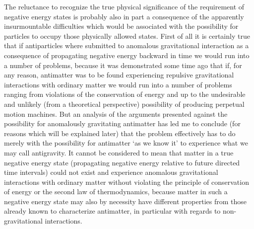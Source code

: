 \documentclass[notitlepage,12pt]{report}
\begin{document}
The reluctance to recognize the true physical significance of the requirement of negative energy states is probably also in part a consequence of the apparently insurmountable difficulties which would be associated with the possibility for particles to occupy those physically allowed states. First of all it is certainly true that if antiparticles where submitted to anomalous gravitational interaction as a consequence of propagating negative energy backward in time we would run into a number of problems, because it was demonstrated some time ago \cite{Nieto-1} that if, for any reason, antimatter was to be found experiencing repulsive gravitational interactions with ordinary matter we would run into a number of problems ranging from violations of the conservation of energy and up to the undesirable and unlikely (from a theoretical perspective) possibility of producing perpetual motion machines. But an analysis of the arguments presented against the possibility for anomalously gravitating antimatter has led me to conclude (for reasons which will be explained later) that the problem effectively has to do merely with the possibility for antimatter `as we know it' to experience what we may call antigravity. It cannot be considered to mean that matter in a true negative energy state (propagating negative energy relative to future directed time intervals) could not exist and experience anomalous gravitational interactions with ordinary matter without violating the principle of conservation of energy or the second law of thermodynamics, because matter in such a negative energy state may also by necessity have different properties from those already known to characterize antimatter, in particular with regards to non-gravitational interactions.
\end{document}
